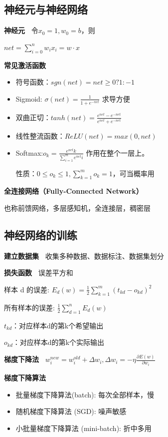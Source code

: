 \documentclass[b4paper, 10pt]{ctexart}
\begin{document}
\begin{multicols}{3}

\subsection{神经元与神经网络}
\textbf{神经元\ }
令$x_0=1, w_0=b$，则

$net = \sum_{i=0}^n w_ix_i=w\cdot x$

\textbf{常见激活函数}
\begin{itemize}
    \item 符号函数：$sgn(net)=net\ge 0?1:-1$
    \item Sigmoid: $\sigma(net) = \frac{1}{1+e^{-net}}$ 求导方便
    \item 双曲正切：$tanh(net)=\frac{e^{net}-e^{-net}}{e^{net}+e^{-net}}$
    \item 线性整流函数：$ReLU(net)=max(0,net)$
    \item Softmax:$o_k=\frac{e^{net}k}{\sum_{i=1}^m e^{net}i}$ 
    作用在整个一层上。

    性质：$0\le o_k\le 1, \sum_{k=1}^m o_k=1$，可当概率用
\end{itemize}

\textbf{全连接网络（Fully-Connected Network）}

也称前馈网络，多层感知机，全连接层，稠密层

\subsection{神经网络的训练}

\textbf{建立数据集\ } 收集多种数据、数据标注、数据集划分

\textbf{损失函数\ } 误差平方和

样本 d 的误差: $E_d(w)=\frac{1}{2} \sum_{k=1}^m (t_{kd}-o_{kd})^2$

所有样本的误差: $\frac{1}{2} \sum_{d=1}^n E_d(w)$

$t_{kd}$：对应样本d的第k个希望输出

$o_{kd}$：对应样本d的第k个实际输出

\textbf{梯度下降法\ } $w_{i}^{new} = w_i^{old}+\Delta w_i, \Delta w_i = -\eta \frac{\partial E(w)}{\partial w_i}$

\textbf{梯度下降算法}
\begin{itemize}
    \item 批量梯度下降算法(batch): 每次全部样本，慢
    \item 随机梯度下降算法 (SGD): 噪声敏感
    \item 小批量梯度下降算法 (mini-batch): 折中多用
\end{itemize}


\end{multicols}
\end{document}
